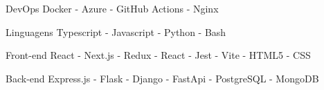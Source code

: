

\begin{cvskills}

  \cvskill
    {DevOps} %
    {Docker - Azure - GitHub Actions - Nginx} %

  \cvskill
    {Linguagens} %
    {Typescript - Javascript - Python - Bash} %

  \cvskill
      {Front-end} %
      {React - Next.js - Redux - React - Jest - Vite - HTML5 - CSS} %

  \cvskill
    {Back-end} %
    {Express.js - Flask - Django - FastApi -  PostgreSQL - MongoDB} %

\end{cvskills}
